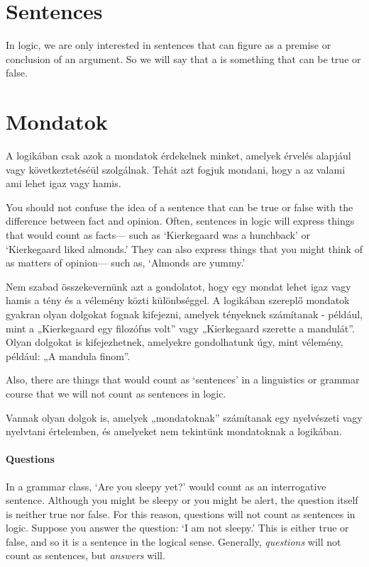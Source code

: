 \section*{Sentences}
\label{intro.sentences}
In logic, we are only interested in sentences that can figure as a premise or conclusion of an argument. So we will say that a  is something that can be true or false.


\section*{Mondatok}
\label {intro.sentences}
A logikában csak azok a mondatok érdekelnek minket, amelyek érvelés alapjául vagy következtetéséül szolgálnak. Tehát azt fogjuk mondani, hogy a  az valami ami lehet igaz vagy hamis.


You should not confuse the idea of a sentence that can be true or false with the difference between fact and opinion. Often, sentences in logic will express things that would count as facts--- such as `Kierkegaard was a hunchback' or `Kierkegaard liked almonds.' They can also express things that you might think of as matters of opinion--- such as, `Almonds are yummy.'


Nem szabad összekevernünk azt a gondolatot, hogy egy mondat lehet igaz vagy hamis a tény és a vélemény közti különbséggel. A logikában szereplő mondatok gyakran olyan dolgokat fognak kifejezni, amelyek tényeknek számítanak - például, mint a „Kierkegaard egy filozófus volt” vagy „Kierkegaard szerette a mandulát”. Olyan dolgokat is kifejezhetnek, amelyekre gondolhatunk úgy, mint vélemény, például: „A mandula finom”.

Also, there are things that would count as `sentences' in a linguistics or grammar course that we will not count as sentences in logic.

Vannak olyan dolgok is, amelyek „mondatoknak” számítanak egy nyelvészeti vagy nyelvtani értelemben, és amelyeket nem tekintünk mondatoknak a logikában.

\paragraph{Questions} In a grammar class, `Are you sleepy yet?' would count as an interrogative sentence. Although you might be sleepy or you might be alert, the question itself is neither true nor false. For this reason, questions will not count as sentences in logic. Suppose you answer the question: `I am not sleepy.' This is either true or false, and so it is a sentence in the logical sense. Generally, \emph{questions} will not count as sentences, but \emph{answers} will.


